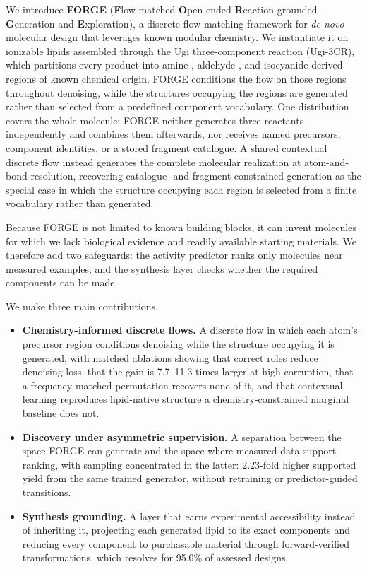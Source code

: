 \documentclass{article}
\newcounter{none}
\newcommand{\CorruptLow}{7.7}                 %
\newcommand{\CorruptHigh}{11.3}               %
\newcommand{\ResolveRate}{95.0\%}
\newcommand{\YieldRatio}{2.23}
\begin{document}
We introduce \textbf{FORGE} (\textbf{F}low-matched \textbf{O}pen-ended
\textbf{R}eaction-grounded \textbf{G}eneration and \textbf{E}xploration), a discrete flow-matching
framework for \emph{de novo} molecular design that leverages known modular chemistry. We instantiate it on
ionizable lipids assembled through the Ugi three-component reaction (Ugi-3CR), which partitions every
product into amine-, aldehyde-, and isocyanide-derived regions of known chemical origin. FORGE
conditions the flow on those regions throughout denoising, while the structures occupying the regions are
generated rather than selected from a predefined component vocabulary. One distribution covers the
whole molecule: FORGE neither generates three reactants independently and combines them afterwards,
nor receives named precursors, component identities, or a stored fragment catalogue. A shared
contextual discrete flow instead generates the complete molecular realization at atom-and-bond
resolution, recovering catalogue- and fragment-constrained generation as the special case in which
the structure occupying each region is selected from a finite vocabulary rather than generated.

Because FORGE is not limited to known building blocks, it can invent molecules for which we lack
biological evidence and readily available starting materials. We therefore add two safeguards: the
activity predictor ranks only molecules near measured examples, and the synthesis layer checks
whether the required components can be made.

We make three main contributions.
\begin{itemize}
\setlength{\itemsep}{0pt}
\item \textbf{Chemistry-informed discrete flows.} A discrete flow in which each atom's precursor
region conditions denoising while the structure occupying it is generated, with matched ablations
showing that correct roles reduce denoising loss, that the gain is \CorruptLow{}--\CorruptHigh{}
times larger at high corruption, that a frequency-matched permutation recovers none of it, and that
contextual learning reproduces lipid-native structure a chemistry-constrained marginal baseline does
not.
\item \textbf{Discovery under asymmetric supervision.} A separation between the space FORGE can
generate and the space where measured data support ranking, with sampling concentrated in the
latter: \YieldRatio{}-fold higher supported yield from the same trained generator, without
retraining or predictor-guided transitions.
\item \textbf{Synthesis grounding.} A layer that earns experimental accessibility instead of
inheriting it, projecting each generated lipid to its exact components and reducing every component
to purchasable material through forward-verified transformations, which resolves for \ResolveRate{}
of assessed designs.
\end{itemize}
\end{document}
